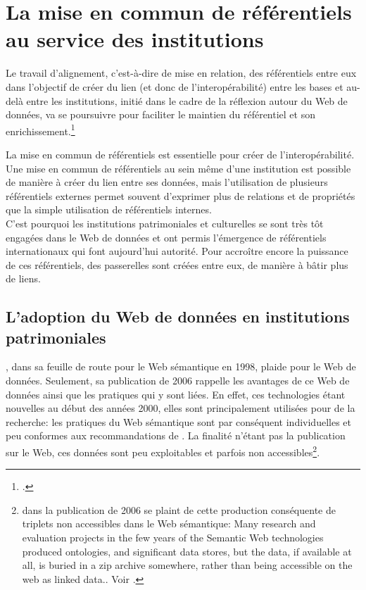 \section{\label{II-A-2}La mise en commun de référentiels au service des institutions}

\begin{citationLongue}
	Le travail d’alignement, c’est-à-dire de mise en relation, des référentiels entre eux dans l’objectif de créer du lien (et donc de l’interopérabilité) entre les bases et au-delà entre les institutions, initié dans le cadre de la réflexion autour du Web de données, va se poursuivre pour faciliter le maintien du référentiel et son enrichissement.\footcite{poupeau_reflexions_2018}
\end{citationLongue}
\medskip
La mise en commun de référentiels est essentielle pour créer de l'interopérabilité. Une mise en commun de référentiels au sein même d'une institution est possible de manière à créer du lien entre ses données, mais l'utilisation de plusieurs référentiels externes permet souvent d'exprimer plus de relations et de propriétés que la simple utilisation de référentiels internes.\\

C'est pourquoi les institutions patrimoniales et culturelles se sont très tôt engagées dans le Web de données et ont permis l'émergence de référentiels internationaux qui font aujourd'hui autorité. Pour accroître encore la puissance de ces référentiels, des passerelles sont créées entre eux, de manière à bâtir plus de liens.

\subsection{\label{II-A-2-a}L'adoption du Web de données en institutions patrimoniales}

, dans sa feuille de route pour le Web sémantique en 1998, plaide pour le Web de données. Seulement, sa publication de 2006 rappelle les avantages de ce Web de données ainsi que les pratiques qui y sont liées. En effet, ces technologies étant nouvelles au début des années 2000, elles sont principalement utilisées pour de la recherche: les pratiques du Web sémantique sont par conséquent individuelles et peu conformes aux recommandations de . La finalité n'étant pas la publication sur le Web, ces données sont peu exploitables et parfois non accessibles\footnote{ dans la publication de 2006 se plaint de cette production conséquente de triplets non accessibles dans le Web sémantique: \og Many research and evaluation projects in the few years of the Semantic Web technologies produced ontologies, and significant data stores, but the data, if available at all, is buried in a zip archive somewhere, rather than being accessible on the web as linked data.\fg{}. Voir \cite{berners-lee_linked_2006}.}.\\

